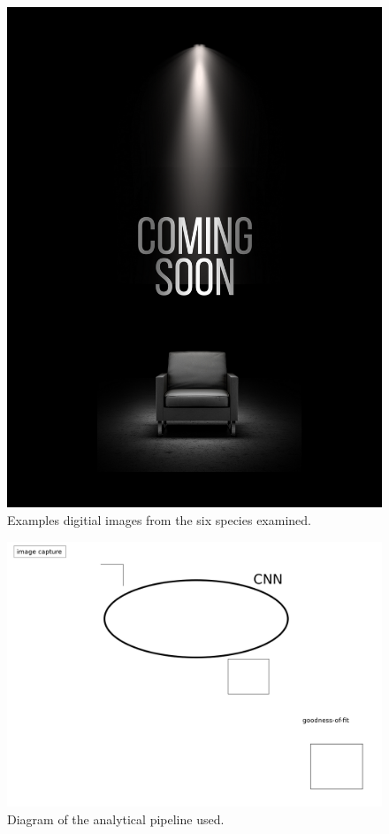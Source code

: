 \begin{figure}\label{fig:example-images}
\includegraphics{figures/temp.png}
\caption{Examples digitial images from the six species examined.}
\end{figure}

\begin{figure}\label{fig:pipeline}
\includegraphics{figures/pipeline-diagram-figure.png}
\caption{Diagram of the analytical pipeline used.}
\end{figure}


